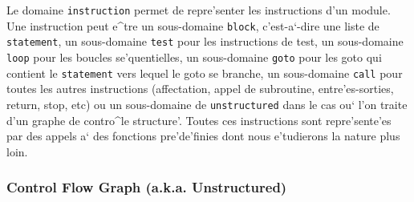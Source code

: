 { 
Le domaine \verb/instruction/ permet de repre'senter les instructions
d'un module. Une instruction peut e^tre un sous-domaine \verb/block/,
c'est-a`-dire une liste de \verb/statement/, un sous-domaine \verb/test/
pour les instructions de test, un sous-domaine \verb/loop/ pour les
boucles se'quentielles, un sous-domaine \verb/goto/ pour les goto qui
contient le
\verb/statement/ vers lequel le goto se branche, un sous-domaine
\verb/call/ pour toutes les autres instructions (affectation, appel de
subroutine, entre'es-sorties, return, stop, etc) ou un sous-domaine de
\verb/unstructured/ dans le cas ou` l'on traite d'un graphe de contro^le
structure'. Toutes ces instructions 
sont repre'sente'es par des appels a` des fonctions pre'de'finies dont
nous e'tudierons la nature plus loin.
}

\subsubsection{Control Flow Graph (a.k.a. Unstructured)}
\label{subsubsection-unstructured}

